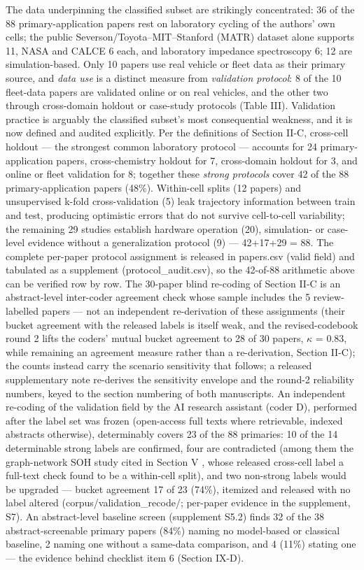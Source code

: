 \documentclass[journal]{IEEEtran}
\begin{document}
The data underpinning the classified subset are strikingly concentrated: 36 of the 88 primary-application papers rest on laboratory cycling of the authors' own cells; the public Severson/Toyota--MIT--Stanford (MATR) dataset alone supports 11, NASA and CALCE 6 each, and laboratory impedance spectroscopy 6; 12 are simulation-based. Only 10 papers use real vehicle or fleet data as their primary source, and \textit{data use} is a distinct measure from \textit{validation protocol}: 8 of the 10 fleet-data papers are validated online or on real vehicles, and the other two through cross-domain holdout or case-study protocols (Table III). Validation practice is arguably the classified subset's most consequential weakness, and it is now defined and audited explicitly. Per the definitions of Section II-C, cross-cell holdout --- the strongest common laboratory protocol --- accounts for 24 primary-application papers, cross-chemistry holdout for 7, cross-domain holdout for 3, and online or fleet validation for 8; together these \textit{strong protocols} cover 42 of the 88 primary-application papers (48\%). Within-cell splits (12 papers) and unsupervised k-fold cross-validation (5) leak trajectory information between train and test, producing optimistic errors that do not survive cell-to-cell variability; the remaining 29 studies establish hardware operation (20), simulation- or case-level evidence without a generalization protocol (9) --- 42+17+29 = 88. The complete per-paper protocol assignment is released in papers.csv (valid field) and tabulated as a supplement (protocol\_audit.csv), so the 42-of-88 arithmetic above can be verified row by row. The 30-paper blind re-coding of Section II-C is an abstract-level inter-coder agreement check whose sample includes the 5 review-labelled papers --- not an independent re-derivation of these assignments (their bucket agreement with the released labels is itself weak, and the revised-codebook round 2 lifts the coders' mutual bucket agreement to 28 of 30 papers, $\kappa$ = 0.83, while remaining an agreement measure rather than a re-derivation, Section II-C); the counts instead carry the scenario sensitivity that follows; a released supplementary note re-derives the sensitivity envelope and the round-2 reliability numbers, keyed to the section numbering of both manuscripts. An independent re-coding of the validation field by the AI research assistant (coder D), performed after the label set was frozen (open-access full texts where retrievable, indexed abstracts otherwise), determinably covers 23 of the 88 primaries: 10 of the 14 determinable strong labels are confirmed, four are contradicted (among them the graph-network SOH study cited in Section V \cite{r31}, whose released cross-cell label a full-text check found to be a within-cell split), and two non-strong labels would be upgraded --- bucket agreement 17 of 23 (74\%), itemized and released with no label altered (corpus/validation\_recode/; per-paper evidence in the supplement, S7). An abstract-level baseline screen (supplement S5.2) finds 32 of the 38 abstract-screenable primary papers (84\%) naming no model-based or classical baseline, 2 naming one without a same-data comparison, and 4 (11\%) stating one --- the evidence behind checklist item 6 (Section IX-D).
\end{document}
